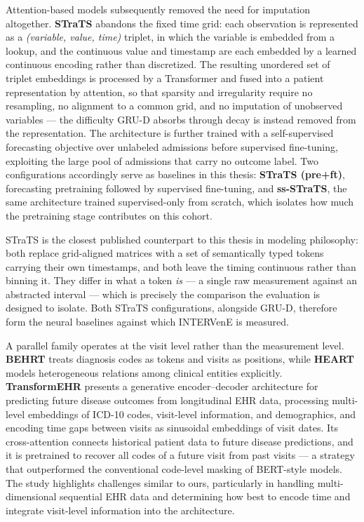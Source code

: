 Attention-based models subsequently removed the need for imputation altogether. \textbf{STraTS} \citep{tipirneni2022strats} abandons the fixed time grid: each observation is represented as a \emph{(variable, value, time)} triplet, in which the variable is embedded from a lookup, and the continuous value and timestamp are each embedded by a learned continuous encoding rather than discretized. The resulting unordered set of triplet embeddings is processed by a Transformer and fused into a patient representation by attention, so that sparsity and irregularity require no resampling, no alignment to a common grid, and no imputation of unobserved variables --- the difficulty GRU-D absorbs through decay is instead removed from the representation. The architecture is further trained with a self-supervised forecasting objective over unlabeled admissions before supervised fine-tuning, exploiting the large pool of admissions that carry no outcome label. Two configurations accordingly serve as baselines in this thesis: \textbf{STraTS (pre+ft)}, forecasting pretraining followed by supervised fine-tuning, and \textbf{ss-STraTS}, the same architecture trained supervised-only from scratch, which isolates how much the pretraining stage contributes on this cohort.

STraTS is the closest published counterpart to this thesis in modeling philosophy: both replace grid-aligned matrices with a set of semantically typed tokens carrying their own timestamps, and both leave the timing continuous rather than binning it. They differ in what a token \emph{is} --- a single raw measurement against an abstracted interval --- which is precisely the comparison the evaluation is designed to isolate. Both STraTS configurations, alongside GRU-D, therefore form the neural baselines against which INTERVenE is measured.

A parallel family operates at the visit level rather than the measurement level. \textbf{BEHRT} \citep{li2020behrt} treats diagnosis codes as tokens and visits as positions, while \textbf{HEART} \citep{huang2024heart} models heterogeneous relations among clinical entities explicitly. \textbf{TransformEHR} \citep{yang2023transformehr} presents a generative encoder--decoder architecture for predicting future disease outcomes from longitudinal EHR data, processing multi-level embeddings of ICD-10 codes, visit-level information, and demographics, and encoding time gaps between visits as sinusoidal embeddings of visit dates. Its cross-attention connects historical patient data to future disease predictions, and it is pretrained to recover all codes of a future visit from past visits --- a strategy that outperformed the conventional code-level masking of BERT-style models. The study highlights challenges similar to ours, particularly in handling multi-dimensional sequential EHR data and determining how best to encode time and integrate visit-level information into the architecture.

